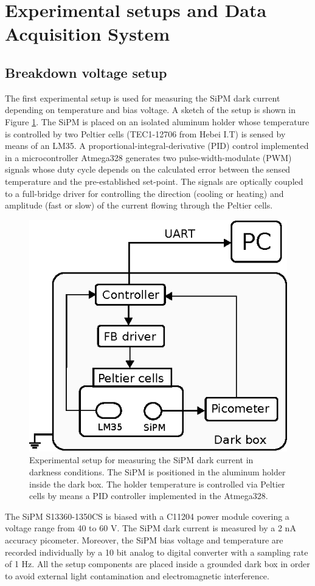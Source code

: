 \documentclass[a4paper,11pt]{article}
\begin{document}
\section{Experimental setups and Data Acquisition System}
\label{sec:exp}

\subsection{Breakdown voltage setup}

The first experimental setup is used for measuring the SiPM dark current depending on temperature and bias voltage. A sketch of the setup is shown in Figure \ref{fig:set1}. The SiPM is placed on an isolated aluminum holder whose temperature is controlled by two Peltier cells (TEC1-12706 from Hebei I.T) is sensed by means of an LM35. A proportional-integral-derivative (PID) control implemented in a microcontroller Atmega328 generates two pulse-width-modulate (PWM) signals whose duty cycle depends on the calculated error between the sensed temperature and the pre-established set-point. The signals are optically coupled to a full-bridge driver for controlling the direction (cooling or heating) and amplitude (fast or slow) of the current flowing through the Peltier cells.

\begin{figure}[htbp]
\centering %
\includegraphics[width=.5\textwidth]{Figures/ExpSet1.eps}
\caption{\label{fig:set1} Experimental setup for measuring the SiPM dark current in darkness conditions. The SiPM is positioned in the aluminum holder inside the dark box. The holder temperature is controlled via Peltier cells by means a PID controller implemented in the Atmega328.}
\end{figure}

The SiPM S13360-1350CS is biased with a C11204 power module covering a voltage range from 40 to 60 V. The SiPM dark current is measured by a 2 nA accuracy picometer. Moreover, the SiPM bias voltage and temperature are recorded individually by a 10 bit analog to digital converter with a sampling rate of 1 Hz. All the setup components are placed inside a grounded dark box in order to avoid external light contamination and electromagnetic interference.
\end{document}
